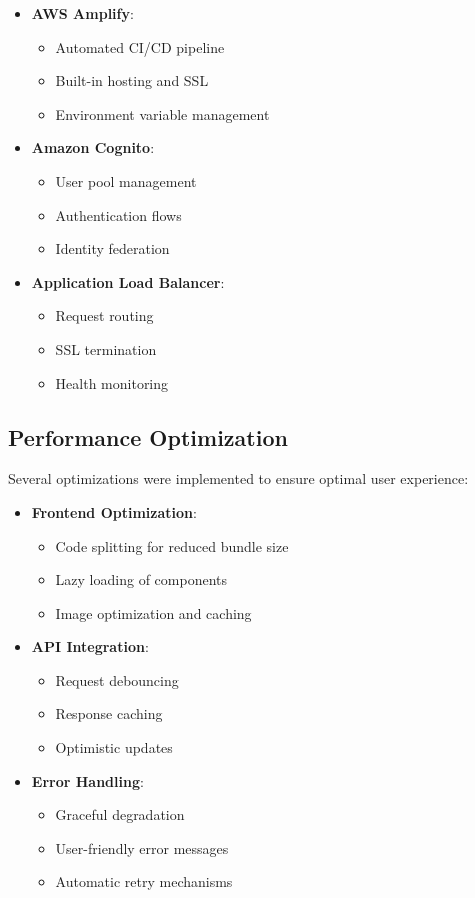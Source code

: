 \documentclass[12pt]{article}
\begin{document}
\begin{itemize}
    \item \textbf{AWS Amplify}:
    \begin{itemize}
        \item Automated CI/CD pipeline
        \item Built-in hosting and SSL
        \item Environment variable management
    \end{itemize}
    
    \item \textbf{Amazon Cognito}:
    \begin{itemize}
        \item User pool management
        \item Authentication flows
        \item Identity federation
    \end{itemize}
    
    \item \textbf{Application Load Balancer}:
    \begin{itemize}
        \item Request routing
        \item SSL termination
        \item Health monitoring
    \end{itemize}
\end{itemize}

\subsection{Performance Optimization}
Several optimizations were implemented to ensure optimal user experience:

\begin{itemize}
    \item \textbf{Frontend Optimization}:
    \begin{itemize}
        \item Code splitting for reduced bundle size
        \item Lazy loading of components
        \item Image optimization and caching
    \end{itemize}
    
    \item \textbf{API Integration}:
    \begin{itemize}
        \item Request debouncing
        \item Response caching
        \item Optimistic updates
    \end{itemize}
    
    \item \textbf{Error Handling}:
    \begin{itemize}
        \item Graceful degradation
        \item User-friendly error messages
        \item Automatic retry mechanisms
    \end{itemize}
\end{itemize}
\end{document}
